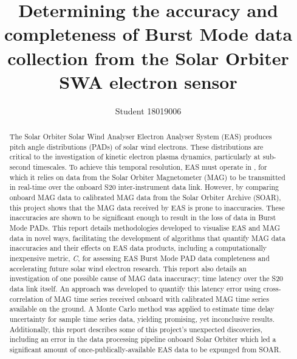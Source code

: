 
\title{Determining the accuracy and completeness of Burst Mode data collection from the Solar Orbiter SWA electron sensor}
\author{Student 18019006}

\maketitle
\makedeclaration

\begin{abstract} %
    The Solar Orbiter Solar Wind Analyser Electron Analyser System (EAS) produces pitch angle distributions (PADs) of solar wind electrons. These distributions are critical to the investigation of kinetic electron plasma dynamics, particularly at sub-second timescales. To achieve this temporal resolution, EAS must operate in , for which it relies on data from the Solar Orbiter Magnetometer (MAG) to be transmitted in real-time over the onboard S20 inter-instrument data link. However, by comparing onboard MAG data to calibrated MAG data from the Solar Orbiter Archive (SOAR), this project shows that the MAG data received by EAS is prone to inaccuracies. These inaccuracies are shown to be significant enough to result in the loss of data in Burst Mode PADs. This report details methodologies developed to visualise EAS and MAG data in novel ways, facilitating the development of algorithms that quantify MAG data inaccuracies and their effects on EAS data products, including a computationally inexpensive metric, \textit{C}, for assessing EAS Burst Mode PAD data completeness and accelerating future solar wind electron research. This report also details an investigation of one possible cause of MAG data inaccuracy; time latency over the S20 data link itself. An approach was developed to quantify this latency error using cross-correlation of MAG time series received onboard with calibrated MAG time series available on the ground. A Monte Carlo method was applied to estimate time delay uncertainty for sample time series data, yielding promising, yet inconclusive results. Additionally, this report describes some of this project's unexpected discoveries, including an error in the data processing pipeline onboard Solar Orbiter which led a significant amount of once-publically-available EAS data to be expunged from SOAR.
\end{abstract}

